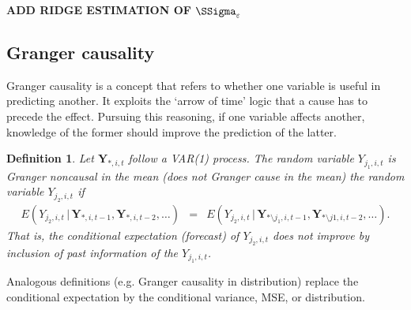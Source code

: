 \documentclass[a4paper]{article}
\theoremstyle{myexamplestyle}
\newtheorem{defin}{Definition}
\def\reminder#1{\marginpar{\rule[0pt]{1mm}{11pt}}\textbf{#1}}
\begin{document}






\[
\]
\reminder{ADD RIDGE ESTIMATION OF $\SSigma_{\varepsilon}$}


\subsection{Granger causality}
Granger causality is a concept that refers to whether one variable is useful in predicting another. It exploits the `arrow of time' logic that a cause has to precede the effect. Pursuing this reasoning, if one variable affects another, knowledge of the former should improve the prediction of the latter.

\begin{defin}
Let $\mathbf{Y}_{\ast, i, t}$ follow a VAR(1) process. The random variable $Y_{j_1, i, t}$ is Granger noncausal in the mean (does not Granger cause in the mean) the random variable $Y_{j_2, i, t}$ if
\begin{eqnarray*}
E(Y_{j_2, i, t} \, | \, \mathbf{Y}_{\ast, i, t-1}, \mathbf{Y}_{\ast, i, t-2}, \ldots ) & = &  E(Y_{j_2, i, t} \, | \, \mathbf{Y}_{\ast \setminus j_1, i, t-1}, \mathbf{Y}_{\ast \setminus j1, i, t-2}, \ldots ).
\end{eqnarray*}
That is, the conditional expectation (forecast) of $Y_{j_2, i, t}$ does not improve by  inclusion of past information of the $Y_{j_1, i, t}$.
\end{defin}

\noindent
Analogous definitions (e.g. Granger causality in distribution) replace the conditional expectation by the conditional variance, MSE, or distribution.
\end{document}
